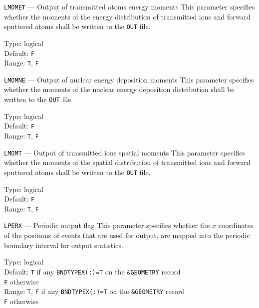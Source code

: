 \begin{keydescription}{\texttt{LMOMET} --- Output of transmitted atoms energy
moments}
%
  This parameter specifies whether the moments of the energy distribution 
  of transmitted ions and forward sputtered atoms shall be written to
  the \texttt{OUT} file. 
  \begin{keytab}
    Type:    \> logical \\
    Default: \> \texttt{F} \\
    Range:   \> \texttt{T}, \texttt{F} 
  \end{keytab}
\end{keydescription}

\begin{keydescription}{\texttt{LMOMNE} --- Output of nuclear energy deposition moments}
%
  This parameter specifies whether the moments of the nuclear energy deposition distribution 
  shall be written to the \texttt{OUT} file.
  \begin{keytab}
    Type:    \> logical \\
    Default: \> \texttt{F} \\
    Range:   \> \texttt{T}, \texttt{F} 
  \end{keytab}
\end{keydescription}

\begin{keydescription}{\texttt{LMOMT} --- Output of transmitted ions spatial moments}
%
  This parameter specifies whether the moments of the spatial distribution 
  of transmitted ions and forward sputtered atoms shall be written to the \texttt{OUT} file.
  \begin{keytab}
    Type:    \> logical \\
    Default: \> \texttt{F} \\
    Range:   \> \texttt{T}, \texttt{F} 
  \end{keytab}
\end{keydescription}

\begin{keydescription}{\texttt{LPERX} --- Periodic output flag}
%
  This parameter specifies whether the $x$ coordinates of the positions of events that are used 
  for output, are mapped into the periodic boundary interval for output statistics.
  \begin{keytab}
    Type:    \> logical \\
    Default: \> \texttt{T} if any \texttt{BNDTYPEX(:)=T} on the 
                \texttt{\&GEOMETRY} record \\
             \> \texttt{F} otherwise \\
    Range:   \> \texttt{T}, \texttt{F}  if any \texttt{BNDTYPEX(:)=T} on the 
                \texttt{\&GEOMETRY} record \\
             \> \texttt{F} otherwise \\
  \end{keytab}
\end{keydescription}

